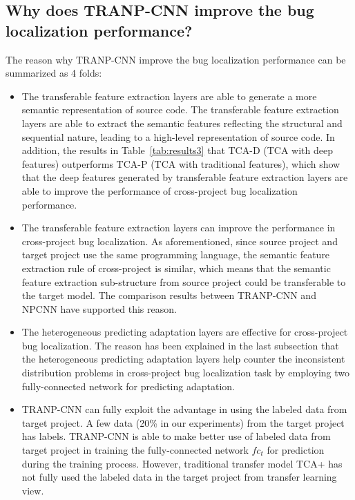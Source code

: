 \subsection{Why does TRANP-CNN improve the bug localization performance?}
The reason why TRANP-CNN improve the bug localization performance can be summarized as 4 folds:
\begin{itemize}
\item The transferable feature extraction layers are able to generate a more semantic representation of source code. The transferable feature extraction layers are able to extract the semantic features reflecting the structural and sequential nature, leading to a high-level representation of source code. In addition, the results in Table~\ref{tab:results3} that TCA-D (TCA with deep features) outperforms TCA-P (TCA with traditional features), which show that the deep features generated by transferable feature extraction layers are able to improve the performance of cross-project bug localization performance. 
\item The transferable feature extraction layers can improve the performance in cross-project bug localization. As aforementioned, since source project and target project use the same programming language, the semantic feature extraction rule of cross-project is similar, which means that the semantic feature extraction sub-structure from source project could be transferable to the target model. The comparison results between TRANP-CNN and NPCNN have supported this reason. 
\item The heterogeneous predicting adaptation layers are effective for cross-project bug localization. The reason has been explained in the last subsection that the heterogeneous predicting adaptation layers help counter the inconsistent distribution problems in cross-project bug localization task by employing two fully-connected network for predicting adaptation.
\item TRANP-CNN can fully exploit the advantage in using the labeled data from target project. A few data (20\% in our experiments) from the target project has labels. TRANP-CNN is able to make better use of labeled data from target project in training the fully-connected network $fc_t$ for prediction during the training process. However, traditional transfer model TCA+ has not fully used the labeled data in the target project from transfer learning view. 
\end{itemize}



